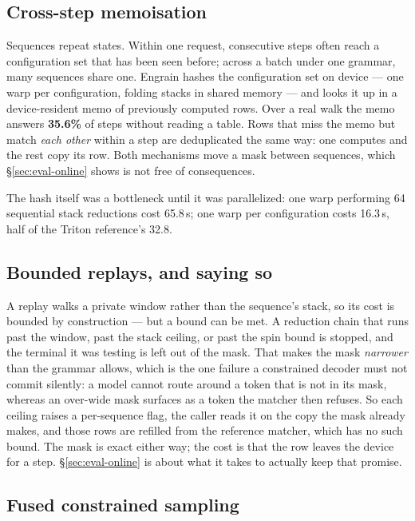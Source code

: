 \documentclass{article}
\begin{document}
\subsection{Cross-step memoisation}
\label{sec:memo}

Sequences repeat states. Within one request, consecutive steps often reach a
configuration set that has been seen before; across a batch under one grammar,
many sequences share one. Engrain hashes the configuration set on device --- one
warp per configuration, folding stacks in shared memory --- and looks it up in a
device-resident memo of previously computed rows. Over a real walk the memo
answers \textbf{35.6\%} of steps without reading a table. Rows that miss the
memo but match \emph{each other} within a step are deduplicated the same way:
one computes and the rest copy its row. Both mechanisms move a mask between
sequences, which \S\ref{sec:eval-online} shows is not free of consequences.

The hash itself was a bottleneck until it was parallelized: one warp performing
64 sequential stack reductions cost 65.8\,\textmu{}s; one warp per configuration
costs 16.3\,\textmu{}s, half of the Triton reference's 32.8.

\subsection{Bounded replays, and saying so}
\label{sec:ceilings}

A replay walks a private window rather than the sequence's stack, so its cost is
bounded by construction --- but a bound can be met. A reduction chain that runs
past the window, past the stack ceiling, or past the spin bound is stopped, and
the terminal it was testing is left out of the mask. That makes the mask
\emph{narrower} than the grammar allows, which is the one failure a
constrained decoder must not commit silently: a model cannot route around a
token that is not in its mask, whereas an over-wide mask surfaces as a token
the matcher then refuses. So each ceiling raises a per-sequence flag, the
caller reads it on the copy the mask already makes, and those rows are refilled
from the reference matcher, which has no such bound. The mask is exact either
way; the cost is that the row leaves the device for a step.
\S\ref{sec:eval-online} is about what it takes to actually keep that promise.

\subsection{Fused constrained sampling}
\label{sec:sampling}
\end{document}
